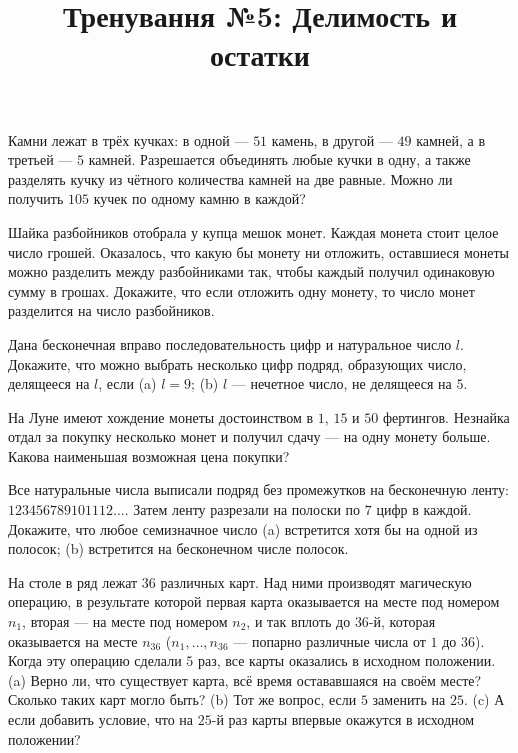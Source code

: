 


\title{Тренування №5: Делимость и остатки}
\maketitle
\begin{problem}
	Камни лежат в трёх кучках: в одной --- $51$ камень, в другой --- $49$ камней, а в третьей --- $5$ камней. Разрешается объединять любые кучки в одну, а также разделять кучку из чётного количества камней на две равные. Можно ли получить $105$ кучек по одному камню в каждой?
\end{problem}

\begin{problem}
	Шайка разбойников отобрала у купца мешок монет. Каждая монета стоит целое число грошей. Оказалось, что какую бы монету ни отложить, оставшиеся монеты можно разделить между разбойниками так, чтобы каждый получил одинаковую сумму в грошах. Докажите, что если отложить одну монету, то число монет разделится на число разбойников.
\end{problem}

\begin{problem}
	Дана бесконечная вправо последовательность цифр и натуральное число $l$. Докажите, что можно выбрать несколько цифр подряд, образующих число, делящееся на $l$, если (a) $l = 9$; (b) $l$ --- нечетное число, не делящееся на $5$.
\end{problem}

\begin{problem}
	На Луне имеют хождение монеты достоинством в $1$, $15$ и $50$ фертингов. Незнайка отдал за покупку несколько монет и получил сдачу --- на одну монету больше. Какова наименьшая возможная цена покупки?
\end{problem}

\begin{problem}
	Все натуральные числа выписали подряд без промежутков на бесконечную ленту: $123456789101112\ldots$. Затем ленту разрезали на полоски по $7$ цифр в каждой. Докажите, что любое семизначное число (a) встретится хотя бы на одной из полосок; (b) встретится на бесконечном числе полосок.
\end{problem}

\begin{problem}
	На столе в ряд лежат $36$ различных карт. Над ними производят магическую операцию, в результате которой первая карта оказывается на месте под номером $n_1$, вторая --- на месте под номером $n_2$, и так вплоть до $36$-й, которая оказывается на месте $n_{36}$ ($n_1, \ldots, n_{36}$ --- попарно различные числа от $1$ до $36$). Когда эту операцию сделали $5$ раз, все карты оказались в исходном положении. (a) Верно ли, что существует карта, всё время остававшаяся на своём месте? Сколько таких карт могло быть? (b) Тот же вопрос, если $5$ заменить на $25$. (c) А если добавить условие, что на $25$-й раз карты впервые окажутся в исходном положении?
\end{problem}

